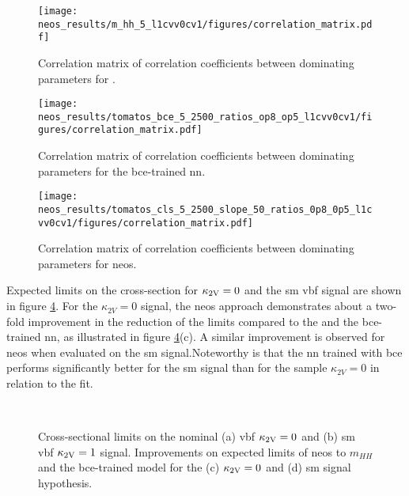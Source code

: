 \begin{figure}
    \centering
    \texttt{[image: neos\_results/m\_hh\_5\_l1cvv0cv1/figures/correlation\_matrix.pdf]}
    \caption[]{Correlation matrix of correlation coefficients between dominating parameters for \mhh.}
    \label{fig:correlation_matrix_m_hh}
\end{figure}
\begin{figure}
    \centering
    \texttt{[image: neos\_results/tomatos\_bce\_5\_2500\_ratios\_op8\_op5\_l1cvv0cv1/figures/correlation\_matrix.pdf]}
    \caption[]{Correlation matrix of correlation coefficients between dominating parameters for the \ac{bce}-trained \ac{nn}.}
    \label{fig:correlation_matrix_bce}
\end{figure}
\begin{figure}
    \centering
    \texttt{[image: neos\_results/tomatos\_cls\_5\_2500\_slope\_50\_ratios\_0p8\_0p5\_l1cvv0cv1/figures/correlation\_matrix.pdf]}
    \caption[]{Correlation matrix of correlation coefficients between dominating parameters for \ac{neos}.}
    \label{fig:correlation_matrix_cls}
\end{figure}

Expected limits on the cross-section for $\kappa_{\text{2V}}=0$ and the \ac{sm} \ac{vbf} signal are shown in figure \ref{fig:neos_valid_brazil_limits}.  For the $\kappa_{2V} = 0$ signal, the \ac{neos} approach demonstrates about a two-fold improvement in the reduction of the limits compared to the \mhh and the \ac{bce}-trained \ac{nn}, as illustrated in figure \ref{fig:neos_valid_brazil_limits}(c). A similar improvement is observed for \ac{neos} when evaluated on the \ac{sm} signal.Noteworthy is that the \ac{nn} trained with \ac{bce} performs significantly better for the \ac{sm} signal than for the sample $\kappa_{2V} = 0$ in relation to the \mhh fit.

\begin{figure}
    \centering
    \\
    \caption[]{Cross-sectional limits on the nominal (a) \ac{vbf} $\kappa_{\text{2V}}=0$ and (b) \ac{sm} \ac{vbf} $\kappa_{\text{2V}}=1$ signal. Improvements on expected limits of \ac{neos} to $m_{HH}$ and the \ac{bce}-trained model for the (c) $\kappa_{\text{2V}}=0$ and (d) \ac{sm} signal hypothesis.}
    \label{fig:neos_valid_brazil_limits}
\end{figure}


